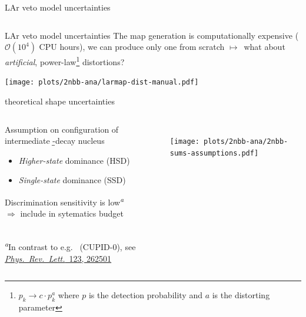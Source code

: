 \documentclass[10pt,aspectratio=169]{beamer}
\newcommand{\arrow}{$\longmapsto$}
\begin{document}
\begin{frame}{LAr veto model uncertainties}
\begin{columns}
\begin{column}{0.15\textwidth}
\begin{center}
      \end{center}
    \end{column}
  \end{columns}
\end{frame}
\begin{frame}{LAr veto model uncertainties}
  The map generation is computationally expensive ($\mathcal{O}{(10^4)}$ CPU
  hours), we can produce only one from scratch \arrow\ what about
  \emph{artificial}, power-law\footnote{$p_k \rightarrow c \cdot p_k^a$ where
  $p$ is the detection probability and $a$ is the distorting parameter}
  distortions?
  \begin{center}
    \texttt{[image: plots/2nbb-ana/larmap-dist-manual.pdf]}
  \end{center}
\end{frame}
\begin{frame}{\texorpdfstring{\nnbb}{2νββ} theoretical shape uncertainties}
  \begin{columns}
    \begin{column}{0.45\textwidth}\setlength{\parskip}{10pt}%
      Assumption on configuration of intermediate \b\b-decay nucleus
      \begin{itemize}
        \item \emph{Higher-state} dominance (\alert{HSD})
        \item \emph{Single-state} dominance (\alert{SSD})
      \end{itemize}
      \begin{simpleblock}
        Discrimination sensitivity is low\textsuperscript{\emph{a}} \\
        $\Rightarrow$ include in sytematics budget
      \end{simpleblock}
      \hrulefill \\
      {\footnotesize \textsuperscript{\emph{a}}In contrast to e.g.~ (CUPID-0), see
      \href{https://doi.org/10.1103/PhysRevLett.123.262501}{\emph{Phys.~Rev.~Lett.}~123, 262501}}
    \end{column}
    \begin{column}{0.55\textwidth}
      \centering
      \vspace*{0.5cm} \\
      \texttt{[image: plots/2nbb-ana/2nbb-sums-assumptions.pdf]}
    \end{column}
  \end{columns}
\end{frame}
\end{document}
